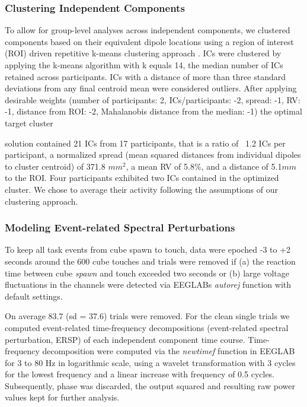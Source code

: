 
\subsubsection{Clustering Independent Components}
To allow for group-level analyses across independent components, we clustered components based on their equivalent dipole locations using a region of interest (ROI) driven repetitive k-means clustering approach \cite{Gramann2018}. ICs were clustered by applying the k-means algorithm with k equals 14, the median number of ICs retained across participants. ICs with a distance of more than three standard deviations from any final centroid mean were considered outliers. After applying desirable weights (number of participants: 2, ICs/participants: -2, spread: -1, RV: -1, distance from ROI: -2, Mahalanobis distance from the median: -1) the optimal target cluster 


solution contained 21 ICs from 17 participants, that is a ratio of ~1.2 ICs per participant, a normalized spread (mean squared distances from individual dipoles to cluster centroid) of 371.8 $mm^2$, a mean RV of 5.8\%, and a distance of 5.1$mm$ to the ROI. Four participants exhibited two ICs contained in the optimized cluster. We chose to average their activity following the assumptions of our clustering approach.

\subsubsection{Modeling Event-related Spectral Perturbations}
To keep all task events from cube spawn to touch, data were epoched -3 to +2 seconds around the 600 cube touches and trials were removed if (a) the reaction time between cube \textit{spawn} and touch exceeded two seconds or (b) large voltage fluctuations in the channels were detected via EEGLABs \textit{autorej} function with default settings.


On average 83.7 (sd = 37.6) trials were removed. For the clean single trials we computed event-related time-frequency decompositions (event-related spectral perturbation, ERSP) of each independent component time course. Time-frequency decomposition were computed via the \textit{newtimef} function in EEGLAB for 3 to 80 Hz in logarithmic scale, using a wavelet transformation with 3 cycles for the lowest frequency and a linear increase with frequency of 0.5 cycles. Subsequently, phase was discarded, the output squared and resulting raw power values kept for further analysis.

